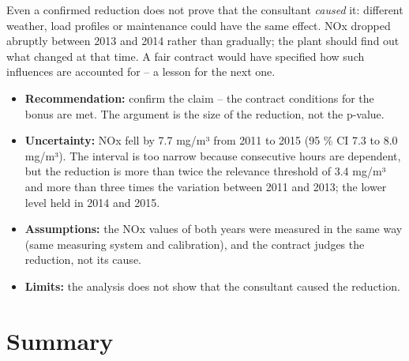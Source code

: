 \documentclass[
  letterpaper,
  DIV=11,
  numbers=noendperiod]{scrreprt}
\providecommand{\tightlist}{%
  \setlength{\itemsep}{0pt}\setlength{\parskip}{0pt}}\usepackage{longtable,booktabs,array}
\begin{document}
Even a confirmed reduction does not prove that the consultant
\emph{caused} it: different weather, load profiles or maintenance could
have the same effect. NOx dropped abruptly between 2013 and 2014 rather
than gradually; the plant should find out what changed at that time. A
fair contract would have specified how such influences are accounted for
-- a lesson for the next one.

\begin{tcolorbox}[enhanced jigsaw, left=2mm, title=\textcolor{quarto-callout-important-color}{\faExclamation}\hspace{0.5em}{Recommendation to the plant management}, opacityback=0, breakable, rightrule=.15mm, arc=.35mm, toptitle=1mm, colbacktitle=quarto-callout-important-color!10!white, opacitybacktitle=0.6, coltitle=black, colframe=quarto-callout-important-color-frame, bottomrule=.15mm, leftrule=.75mm, bottomtitle=1mm, titlerule=0mm, toprule=.15mm, colback=white]

\begin{itemize}
\tightlist
\item
  \textbf{Recommendation:} confirm the claim -- the contract conditions
  for the bonus are met. The argument is the size of the reduction, not
  the p-value.
\item
  \textbf{Uncertainty:} NOx fell by 7.7 mg/m³ from 2011 to 2015 (95 \%
  CI 7.3 to 8.0 mg/m³). The interval is too narrow because consecutive
  hours are dependent, but the reduction is more than twice the
  relevance threshold of 3.4 mg/m³ and more than three times the
  variation between 2011 and 2013; the lower level held in 2014 and
  2015.
\item
  \textbf{Assumptions:} the NOx values of both years were measured in
  the same way (same measuring system and calibration), and the contract
  judges the reduction, not its cause.
\item
  \textbf{Limits:} the analysis does not show that the consultant caused
  the reduction.
\end{itemize}

\end{tcolorbox}

\section{Summary}\label{summary-4}
\end{document}
